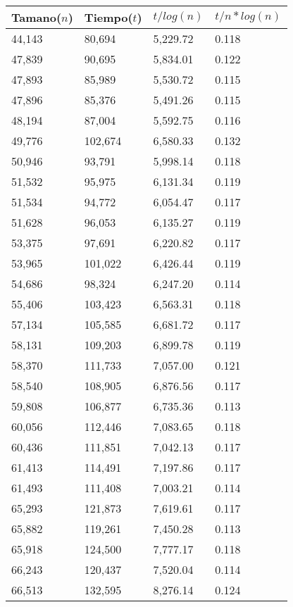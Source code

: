 \begin{table}[H]
\parbox{0.3\textwidth}{
  \begin{tabular}{| l | l | l |l |}
    \hline
    Tamano($n$) & Tiempo($t$) & $t / log(n)$ & $t / n*log(n)$ \\ \hline
44,143	&	80,694	&	5,229.72	&	0.118	\\ \hline
47,839	&	90,695	&	5,834.01	&	0.122	\\ \hline
47,893	&	85,989	&	5,530.72	&	0.115	\\ \hline
47,896	&	85,376	&	5,491.26	&	0.115	\\ \hline
48,194	&	87,004	&	5,592.75	&	0.116	\\ \hline
49,776	&	102,674	&	6,580.33	&	0.132	\\ \hline
50,946	&	93,791	&	5,998.14	&	0.118	\\ \hline
51,532	&	95,975	&	6,131.34	&	0.119	\\ \hline
51,534	&	94,772	&	6,054.47	&	0.117	\\ \hline
51,628	&	96,053	&	6,135.27	&	0.119	\\ \hline
53,375	&	97,691	&	6,220.82	&	0.117	\\ \hline
53,965	&	101,022	&	6,426.44	&	0.119	\\ \hline
54,686	&	98,324	&	6,247.20	&	0.114	\\ \hline
55,406	&	103,423	&	6,563.31	&	0.118	\\ \hline
57,134	&	105,585	&	6,681.72	&	0.117	\\ \hline
58,131	&	109,203	&	6,899.78	&	0.119	\\ \hline
58,370	&	111,733	&	7,057.00	&	0.121	\\ \hline
58,540	&	108,905	&	6,876.56	&	0.117	\\ \hline
59,808	&	106,877	&	6,735.36	&	0.113	\\ \hline
60,056	&	112,446	&	7,083.65	&	0.118	\\ \hline
60,436	&	111,851	&	7,042.13	&	0.117	\\ \hline
61,413	&	114,491	&	7,197.86	&	0.117	\\ \hline
61,493	&	111,408	&	7,003.21	&	0.114	\\ \hline
65,293	&	121,873	&	7,619.61	&	0.117	\\ \hline
65,882	&	119,261	&	7,450.28	&	0.113	\\ \hline
65,918	&	124,500	&	7,777.17	&	0.118	\\ \hline
66,243	&	120,437	&	7,520.04	&	0.114	\\ \hline
66,513	&	132,595	&	8,276.14	&	0.124	\\ \hline

\end{tabular}}
\end{table}
